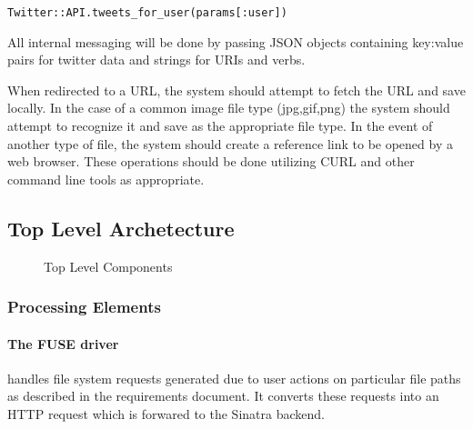 \begin{alltt}
    Twitter::API.tweets\_for\_user(params[:user])
\end{alltt}

All internal messaging will be done by passing JSON objects containing key:value
pairs for twitter data and strings for URIs and verbs.

When redirected to a URL, the system should attempt to fetch the URL and save
locally. In the case of a common image file type (jpg,gif,png) the system should
attempt to recognize it and save as the appropriate file type. In the event of
another type of file, the system should create a reference link to be opened by
a web browser. These operations should be done utilizing CURL and other command
line tools as appropriate.  

\subsection{Top Level Archetecture}

\begin{figure}[h]
\centering
{}
\caption{Top Level Components}\label{fig:top-top}
\end{figure}

\subsubsection{Processing Elements}

\paragraph{The FUSE driver} handles file system requests generated due
to user actions on particular file paths as described in the requirements
document. It converts these requests into an HTTP request which is forwared to
the Sinatra backend.


